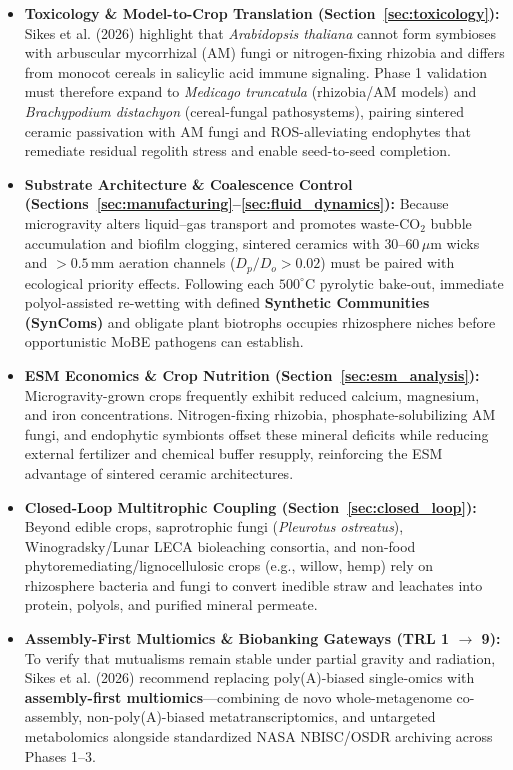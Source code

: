 \begin{itemize}
    \item \textbf{Toxicology \& Model-to-Crop Translation (Section~\ref{sec:toxicology}):} Sikes et al. (2026) highlight that \textit{Arabidopsis thaliana} cannot form symbioses with arbuscular mycorrhizal (AM) fungi or nitrogen-fixing rhizobia and differs from monocot cereals in salicylic acid immune signaling\cite{sikes2026charting}. Phase 1 validation must therefore expand to \textit{Medicago truncatula} (rhizobia/AM models) and \textit{Brachypodium distachyon} (cereal-fungal pathosystems), pairing sintered ceramic passivation with AM fungi and ROS-alleviating endophytes that remediate residual regolith stress and enable seed-to-seed completion\cite{sikes2026charting,atkin2026bioremediation}.
    \item \textbf{Substrate Architecture \& Coalescence Control (Sections~\ref{sec:manufacturing}--\ref{sec:fluid_dynamics}):} Because microgravity alters liquid--gas transport and promotes waste-$\mathrm{CO}_2$ bubble accumulation and biofilm clogging\cite{sikes2026charting,baxter2026biofilms}, sintered ceramics with $30\text{--}60\,\mu\mathrm{m}$ wicks and $>0.5\,\mathrm{mm}$ aeration channels ($D_p/D_o > 0.02$) must be paired with ecological priority effects. Following each $500^\circ\mathrm{C}$ pyrolytic bake-out, immediate polyol-assisted re-wetting with defined \textbf{Synthetic Communities (SynComs)} and obligate plant biotrophs occupies rhizosphere niches before opportunistic MoBE pathogens can establish\cite{sikes2026charting}.
    \item \textbf{ESM Economics \& Crop Nutrition (Section~\ref{sec:esm_analysis}):} Microgravity-grown crops frequently exhibit reduced calcium, magnesium, and iron concentrations\cite{sikes2026charting}. Nitrogen-fixing rhizobia, phosphate-solubilizing AM fungi, and endophytic symbionts offset these mineral deficits while reducing external fertilizer and chemical buffer resupply, reinforcing the ESM advantage of sintered ceramic architectures\cite{sikes2026charting,atkin2026bioremediation}.
    \item \textbf{Closed-Loop Multitrophic Coupling (Section~\ref{sec:closed_loop}):} Beyond edible crops, saprotrophic fungi (\textit{Pleurotus ostreatus}), Winogradsky/Lunar LECA bioleaching consortia, and non-food phytoremediating/lignocellulosic crops (e.g., willow, hemp) rely on rhizosphere bacteria and fungi to convert inedible straw and leachates into protein, polyols, and purified mineral permeate\cite{sikes2026charting,cockell2018biorock,babcsanyi2017biogeochemical}.
    \item \textbf{Assembly-First Multiomics \& Biobanking Gateways (TRL 1 $\to$ 9):} To verify that mutualisms remain stable under partial gravity and radiation, Sikes et al. (2026) recommend replacing poly(A)-biased single-omics with \textbf{assembly-first multiomics}---combining de novo whole-metagenome co-assembly, non-poly(A)-biased metatranscriptomics, and untargeted metabolomics alongside standardized NASA NBISC/OSDR archiving across Phases 1--3\cite{sikes2026charting}.
\end{itemize}

